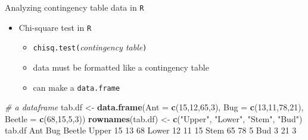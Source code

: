 \documentclass[
  ignorenonframetext,
  t]{beamer}
\newenvironment{Shaded}{\begin{snugshade}}{\end{snugshade}}
\newcommand{\CommentTok}[1]{\textcolor[rgb]{0.56,0.35,0.01}{\textit{#1}}}
\newcommand{\DataTypeTok}[1]{\textcolor[rgb]{0.13,0.29,0.53}{#1}}
\newcommand{\DecValTok}[1]{\textcolor[rgb]{0.00,0.00,0.81}{#1}}
\newcommand{\KeywordTok}[1]{\textcolor[rgb]{0.13,0.29,0.53}{\textbf{#1}}}
\newcommand{\NormalTok}[1]{#1}
\newcommand{\StringTok}[1]{\textcolor[rgb]{0.31,0.60,0.02}{#1}}
\providecommand{\tightlist}{%
  \setlength{\itemsep}{0pt}\setlength{\parskip}{0pt}}
\begin{document}
\begin{frame}[fragile]{Analyzing contingency table data in \texttt{R}}
\protect\hypertarget{analyzing-contingency-table-data-in-3}{}

\begin{itemize}
\tightlist
\item
  Chi-square test in \texttt{R}

  \begin{itemize}
  \tightlist
  \item
    \texttt{chisq.test(}\emph{contingency table}\texttt{)}
  \item
    data must be formatted like a contingency table
  \item
    can make a \texttt{data.frame}
  \end{itemize}
\end{itemize}

\scriptsize

\begin{Shaded}
\begin{Highlighting}[]
\CommentTok{# a dataframe}
\NormalTok{tab.df <-}\StringTok{ }\KeywordTok{data.frame}\NormalTok{(}\DataTypeTok{Ant =} \KeywordTok{c}\NormalTok{(}\DecValTok{15}\NormalTok{,}\DecValTok{12}\NormalTok{,}\DecValTok{65}\NormalTok{,}\DecValTok{3}\NormalTok{),}
                     \DataTypeTok{Bug =} \KeywordTok{c}\NormalTok{(}\DecValTok{13}\NormalTok{,}\DecValTok{11}\NormalTok{,}\DecValTok{78}\NormalTok{,}\DecValTok{21}\NormalTok{),}
                     \DataTypeTok{Beetle =} \KeywordTok{c}\NormalTok{(}\DecValTok{68}\NormalTok{,}\DecValTok{15}\NormalTok{,}\DecValTok{5}\NormalTok{,}\DecValTok{3}\NormalTok{))}
\KeywordTok{rownames}\NormalTok{(tab.df) <-}\StringTok{ }\KeywordTok{c}\NormalTok{(}\StringTok{"Upper"}\NormalTok{, }\StringTok{"Lower"}\NormalTok{, }\StringTok{"Stem"}\NormalTok{, }\StringTok{"Bud"}\NormalTok{)}
\NormalTok{tab.df}
\NormalTok{      Ant Bug Beetle}
\NormalTok{Upper  }\DecValTok{15}  \DecValTok{13}     \DecValTok{68}
\NormalTok{Lower  }\DecValTok{12}  \DecValTok{11}     \DecValTok{15}
\NormalTok{Stem   }\DecValTok{65}  \DecValTok{78}      \DecValTok{5}
\NormalTok{Bud     }\DecValTok{3}  \DecValTok{21}      \DecValTok{3}
\end{Highlighting}
\end{Shaded}

\end{frame}
\end{document}
